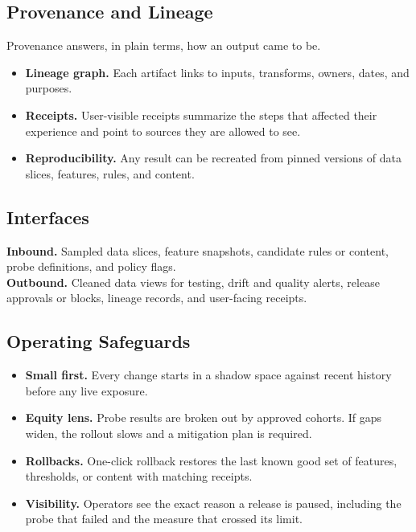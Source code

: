 \documentclass[12pt]{article}
\begin{document}
\subsection*{Provenance and Lineage}
Provenance answers, in plain terms, how an output came to be.
\begin{itemize}[leftmargin=*]
  \item \textbf{Lineage graph.} Each artifact links to inputs, transforms, owners, dates, and purposes.
  \item \textbf{Receipts.} User-visible receipts summarize the steps that affected their experience and point to sources they are allowed to see.
  \item \textbf{Reproducibility.} Any result can be recreated from pinned versions of data slices, features, rules, and content.
\end{itemize}

\subsection*{Interfaces}
\textbf{Inbound.} Sampled data slices, feature snapshots, candidate rules or content, probe definitions, and policy flags. \\
\textbf{Outbound.} Cleaned data views for testing, drift and quality alerts, release approvals or blocks, lineage records, and user-facing receipts.

\subsection*{Operating Safeguards}
\begin{itemize}[leftmargin=*]
  \item \textbf{Small first.} Every change starts in a shadow space against recent history before any live exposure.
  \item \textbf{Equity lens.} Probe results are broken out by approved cohorts. If gaps widen, the rollout slows and a mitigation plan is required.
  \item \textbf{Rollbacks.} One-click rollback restores the last known good set of features, thresholds, or content with matching receipts.
  \item \textbf{Visibility.} Operators see the exact reason a release is paused, including the probe that failed and the measure that crossed its limit.
\end{itemize}
\end{document}
